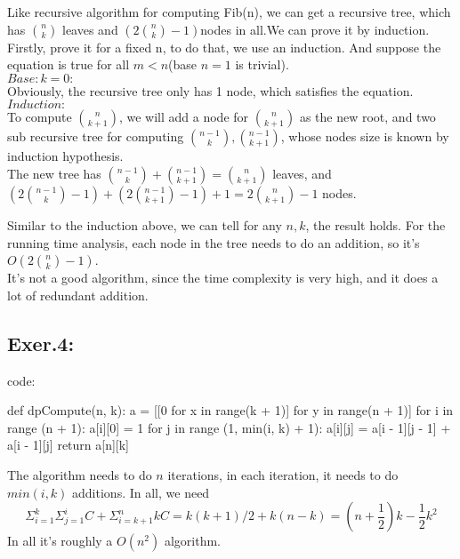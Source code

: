 \documentclass[UTF8]{ctexart}
\begin{document}
Like recursive algorithm for computing Fib(n), we can get a recursive tree, 
which has $ \binom n k$ leaves and $ (2 \binom n k - 1) $nodes in all.We can prove it by induction.
\\
\hspace*{1em} Firstly, prove it for a fixed n, to do that, we use an induction. 
And suppose the equation is true for all $m < n$(base $n = 1$ is trivial).\\
$Base: k = 0:$\\
\hspace*{1em} Obviously, the recursive tree only has 1 node, which satisfies the equation.\\
$Induction:$\\
\hspace*{1em} To compute $\binom n {k+1} $, we will add a node for $\binom n {k+1}$ as the new root,
and two sub recursive tree for computing $\binom {n - 1} {k}, \binom {n - 1}{k + 1}$, 
whose nodes size is known by induction hypothesis.\\
\hspace*{1em} The new tree has $\binom {n-1} {k} + \binom{n - 1} {k + 1} = \binom{n}{k + 1}$ leaves,
and $(2\binom{n - 1}{k} - 1)+ (2\binom{n - 1}{k + 1} -1) + 1= 2\binom n {k + 1} - 1 $ nodes.

Similar to the induction above, we can tell for any $n, k$, the result holds.
For the running time analysis, each node in the tree needs to do an addition,
so it's $O(2 \binom n k - 1)$.\\

It's not a good algorithm, since the time complexity is very high, and it does a lot of 
redundant addition.

\newpage

\subsection*{Exer.4:}
code:
\begin{python}
def dpCompute(n, k):
    a = [[0 for x in range(k + 1)] for y in range(n + 1)] 
    for i in range (n + 1):
        a[i][0] = 1
        for j in range (1, min(i, k) + 1):
            a[i][j] = a[i - 1][j - 1] + a[i - 1][j]
    return a[n][k]
\end{python}
The algorithm needs to do $n$ iterations, in each iteration, it needs to do 
$min(i, k)$ additions. In all, we need 
$$
    \Sigma_{i = 1}^k\Sigma_{j = 1}^i C + \Sigma_{i = k + 1}^nk C 
    = k(k + 1)/2 + k(n - k) 
    = (n + \frac{1}{2})k - \frac{1}{2}k^2
$$
In all it's roughly a $O(n^2)$ algorithm.
\end{document}

